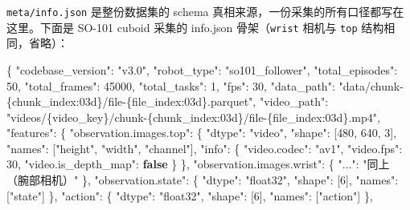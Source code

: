 \documentclass[
  chinese,
]{ctexart}
\newenvironment{Shaded}{\begin{snugshade}}{\end{snugshade}}
\newcommand{\DataTypeTok}[1]{\textcolor[rgb]{0.68,0.00,0.00}{#1}}
\newcommand{\DecValTok}[1]{\textcolor[rgb]{0.68,0.00,0.00}{#1}}
\newcommand{\FunctionTok}[1]{\textcolor[rgb]{0.28,0.35,0.67}{#1}}
\newcommand{\KeywordTok}[1]{\textcolor[rgb]{0.00,0.23,0.31}{\textbf{#1}}}
\newcommand{\OtherTok}[1]{\textcolor[rgb]{0.00,0.23,0.31}{#1}}
\newcommand{\StringTok}[1]{\textcolor[rgb]{0.13,0.47,0.30}{#1}}
\begin{document}
\texttt{meta/info.json} 是整份数据集的 schema
真相来源，一份采集的所有口径都写在这里。下面是 SO-101 cuboid 采集的
info.json 骨架（\texttt{wrist} 相机与 \texttt{top} 结构相同，省略）：

\begin{Shaded}
\begin{Highlighting}[]
\FunctionTok{\{}
  \DataTypeTok{"codebase\_version"}\FunctionTok{:} \StringTok{"v3.0"}\FunctionTok{,}
  \DataTypeTok{"robot\_type"}\FunctionTok{:} \StringTok{"so101\_follower"}\FunctionTok{,}
  \DataTypeTok{"total\_episodes"}\FunctionTok{:} \DecValTok{50}\FunctionTok{,}
  \DataTypeTok{"total\_frames"}\FunctionTok{:} \DecValTok{45000}\FunctionTok{,}
  \DataTypeTok{"total\_tasks"}\FunctionTok{:} \DecValTok{1}\FunctionTok{,}
  \DataTypeTok{"fps"}\FunctionTok{:} \DecValTok{30}\FunctionTok{,}
  \DataTypeTok{"data\_path"}\FunctionTok{:}  \StringTok{"data/chunk{-}\{chunk\_index:03d\}/file{-}\{file\_index:03d\}.parquet"}\FunctionTok{,}
  \DataTypeTok{"video\_path"}\FunctionTok{:} \StringTok{"videos/\{video\_key\}/chunk{-}\{chunk\_index:03d\}/file{-}\{file\_index:03d\}.mp4"}\FunctionTok{,}
  \DataTypeTok{"features"}\FunctionTok{:} \FunctionTok{\{}
    \DataTypeTok{"observation.images.top"}\FunctionTok{:} \FunctionTok{\{}
      \DataTypeTok{"dtype"}\FunctionTok{:} \StringTok{"video"}\FunctionTok{,}
      \DataTypeTok{"shape"}\FunctionTok{:} \OtherTok{[}\DecValTok{480}\OtherTok{,} \DecValTok{640}\OtherTok{,} \DecValTok{3}\OtherTok{]}\FunctionTok{,}
      \DataTypeTok{"names"}\FunctionTok{:} \OtherTok{[}\StringTok{"height"}\OtherTok{,} \StringTok{"width"}\OtherTok{,} \StringTok{"channel"}\OtherTok{]}\FunctionTok{,}
      \DataTypeTok{"info"}\FunctionTok{:} \FunctionTok{\{} \DataTypeTok{"video.codec"}\FunctionTok{:} \StringTok{"av1"}\FunctionTok{,} \DataTypeTok{"video.fps"}\FunctionTok{:} \DecValTok{30}\FunctionTok{,} \DataTypeTok{"video.is\_depth\_map"}\FunctionTok{:} \KeywordTok{false} \FunctionTok{\}}
    \FunctionTok{\},}
    \DataTypeTok{"observation.images.wrist"}\FunctionTok{:} \FunctionTok{\{} \DataTypeTok{"..."}\FunctionTok{:} \StringTok{"同上（腕部相机）"} \FunctionTok{\},}
    \DataTypeTok{"observation.state"}\FunctionTok{:} \FunctionTok{\{} \DataTypeTok{"dtype"}\FunctionTok{:} \StringTok{"float32"}\FunctionTok{,} \DataTypeTok{"shape"}\FunctionTok{:} \OtherTok{[}\DecValTok{6}\OtherTok{]}\FunctionTok{,} \DataTypeTok{"names"}\FunctionTok{:} \OtherTok{[}\StringTok{"state"}\OtherTok{]} \FunctionTok{\},}
    \DataTypeTok{"action"}\FunctionTok{:}            \FunctionTok{\{} \DataTypeTok{"dtype"}\FunctionTok{:} \StringTok{"float32"}\FunctionTok{,} \DataTypeTok{"shape"}\FunctionTok{:} \OtherTok{[}\DecValTok{6}\OtherTok{]}\FunctionTok{,} \DataTypeTok{"names"}\FunctionTok{:} \OtherTok{[}\StringTok{"action"}\OtherTok{]} \FunctionTok{\},}

\end{Highlighting}
\end{Shaded}
\end{document}
